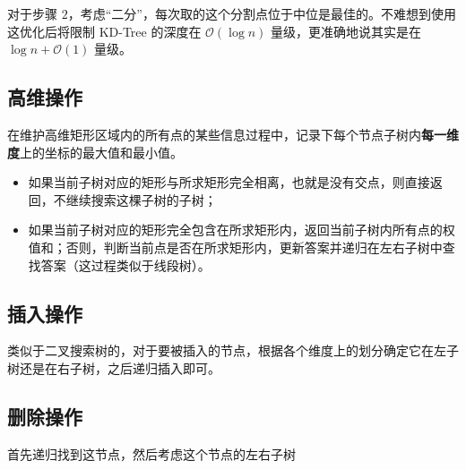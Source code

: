 对于步骤 $2$，考虑“二分”，每次取的这个分割点位于中位是最佳的。不难想到使用这优化后将限制 KD-Tree 的深度在 $\mathcal O\left(\log n\right)$ 量级，更准确地说其实是在 $\log n + \mathcal O(1)$ 量级。

\subsection{高维操作}

在维护高维矩形区域内的所有点的某些信息过程中，记录下每个节点子树内\textbf{每一维度}上的坐标的最大值和最小值。

\begin{itemize}
\item 如果当前子树对应的矩形与所求矩形完全相离，也就是没有交点，则直接返回，不继续搜索这棵子树的子树；

\item 如果当前子树对应的矩形完全包含在所求矩形内，返回当前子树内所有点的权值和；否则，判断当前点是否在所求矩形内，更新答案并递归在左右子树中查找答案（这过程类似于线段树）。
\end{itemize}

\subsection{插入操作}

类似于二叉搜索树的，对于要被插入的节点，根据各个维度上的划分确定它在左子树还是在右子树，之后递归插入即可。

\subsection{删除操作}
首先递归找到这节点，然后考虑这个节点的左右子树